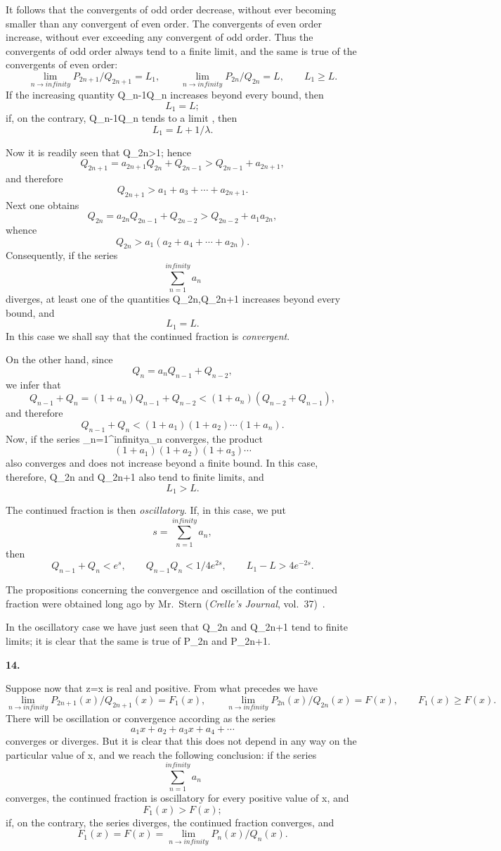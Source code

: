 \documentclass[
  paper=b5,
  fontsize=13pt,
  twoside,
  headings=normal,
  bookmarkpackage=false
]{scrartcl}
\theoremstyle{stieltjesplain}
\theoremstyle{stieltjesdefinition}
\def\({}\def\){}%
\def\frac#1#2{#1/#2}%
\def\infty{infinity}%
\newcommand{\origsection}[1]{%
  \par\addvspace{0.85\baselineskip}%
  \phantomsection\label{sec:#1}%
  \addcontentsline{toc}{subsection}{\texorpdfstring{\S~#1}{Section #1}}%
  \noindent\textbf{#1.}\quad\ignorespaces
}
\begin{document}
It follows that the convergents of odd order decrease, without ever
becoming smaller than any convergent of even order. The convergents of
even order increase, without ever exceeding any convergent of odd order.
Thus the convergents of odd order always tend to a finite limit, and the
same is true of the convergents of even order:
\[
 \lim_{n\to\infty}\frac{P_{2n+1}}{Q_{2n+1}}=L_1,
 \qquad
 \lim_{n\to\infty}\frac{P_{2n}}{Q_{2n}}=L,
 \qquad L_1\geq L.
\]
If the increasing quantity \(Q_{n-1}Q_n\) increases beyond every bound,
then
\[
 L_1=L;
\]
if, on the contrary, \(Q_{n-1}Q_n\) tends to a limit \(\lambda\), then
\[
 L_1=L+\frac1\lambda.
\]

Now it is readily seen that \(Q_{2n}>1\); hence
\[
 Q_{2n+1}=a_{2n+1}Q_{2n}+Q_{2n-1}
  >Q_{2n-1}+a_{2n+1},
\]
and therefore
\[
 Q_{2n+1}>a_1+a_3+\cdots+a_{2n+1}.
\]
Next one obtains
\[
 Q_{2n}=a_{2n}Q_{2n-1}+Q_{2n-2}
  >Q_{2n-2}+a_1a_{2n},
\]
whence
\[
 Q_{2n}>a_1(a_2+a_4+\cdots+a_{2n}).
\]
Consequently, if the series
\[
 \sum_{n=1}^{\infty}a_n
\]
diverges, at least one of the quantities \(Q_{2n},Q_{2n+1}\) increases
beyond every bound, and
\[
 L_1=L.
\]
In this case we shall say that the continued fraction is
\emph{convergent}.

On the other hand, since
\[
 Q_n=a_nQ_{n-1}+Q_{n-2},
\]
we infer that
\[
 Q_{n-1}+Q_n=(1+a_n)Q_{n-1}+Q_{n-2}
 <(1+a_n)(Q_{n-2}+Q_{n-1}),
\]
and therefore
\[
 Q_{n-1}+Q_n<(1+a_1)(1+a_2)\cdots(1+a_n).
\]
Now, if the series \(\sum_{n=1}^{\infty}a_n\) converges, the product
\[
 (1+a_1)(1+a_2)(1+a_3)\cdots
\]
also converges and does not increase beyond a finite bound. In this case,
therefore, \(Q_{2n}\) and \(Q_{2n+1}\) also tend to finite limits, and
\[
 L_1>L.
\]

The continued fraction is then \emph{oscillatory}. If, in this case, we put
\[
 s=\sum_{n=1}^{\infty}a_n,
\]
then
\[
 Q_{n-1}+Q_n<e^s,
 \qquad
 Q_{n-1}Q_n<\frac14e^{2s},
 \qquad
 L_1-L>4e^{-2s}.
\]

The propositions concerning the convergence and oscillation of the
continued fraction were obtained long ago by Mr.~Stern
(\emph{Crelle's Journal}, vol.~37)~\cite{Stern1848}.

In the oscillatory case we have just seen that \(Q_{2n}\) and
\(Q_{2n+1}\) tend to finite limits; it is clear that the same is true of
\(P_{2n}\) and \(P_{2n+1}\).

\origsection{14}
Suppose now that \(z=x\) is real and positive. From what precedes we have
\[
 \lim_{n\to\infty}\frac{P_{2n+1}(x)}{Q_{2n+1}(x)}=F_1(x),
 \qquad
 \lim_{n\to\infty}\frac{P_{2n}(x)}{Q_{2n}(x)}=F(x),
 \qquad
 F_1(x)\geq F(x).
\]
There will be oscillation or convergence according as the series
\[
 a_1x+a_2+a_3x+a_4+\cdots
\]
converges or diverges. But it is clear that this does not depend in any
way on the particular value of \(x\), and we reach the following
conclusion: if the series
\[
 \sum_{n=1}^{\infty}a_n
\]
converges, the continued fraction is oscillatory for every positive value
of \(x\), and
\[
 F_1(x)>F(x);
\]
if, on the contrary, the series diverges, the continued fraction
converges, and
\[
 F_1(x)=F(x)=\lim_{n\to\infty}\frac{P_n(x)}{Q_n(x)}.
\]
\end{document}
